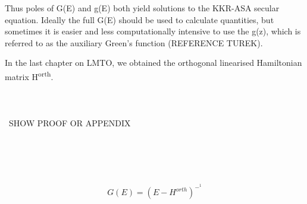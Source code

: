 \documentclass{article}
\begin{document}
Thus poles of G(E) and g(E) both yield solutions to the KKR-ASA secular equation. Ideally the full G(E) should be used to calculate quantities, but sometimes it is easier and less computationally intensive to use the g(z), which is referred to as the auxiliary Green's function (REFERENCE TUREK). 

In the last chapter on LMTO, we obtained the orthogonal linearised Hamiltonian matrix H\textsuperscript{orth}. 
\\\\\\\\\
SHOW PROOF OR APPENDIX
\\\\\\\\\

$$G(E)= (E-H^{orth})^-^1$$
\end{document}
